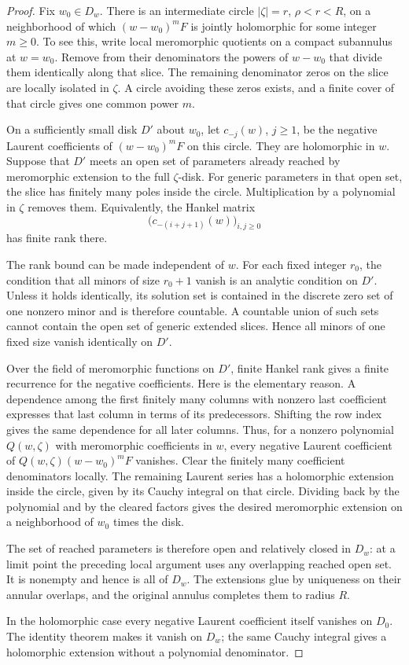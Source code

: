 \begin{proof}
Fix \(w_0\in D_w\).  There is an intermediate circle
\(|\zeta|=r\), \(\rho<r<R\), on a neighborhood of which
\((w-w_0)^m F\) is jointly holomorphic for some integer \(m\ge0\).
To see this, write local meromorphic quotients on a compact
subannulus at \(w=w_0\).  Remove from their denominators the powers
of \(w-w_0\) that divide them identically along that slice.  The
remaining denominator zeros on the slice are locally isolated in
\(\zeta\).  A circle avoiding these zeros exists, and a finite cover
of that circle gives one common power \(m\).

On a sufficiently small disk \(D'\) about \(w_0\), let
\(c_{-j}(w)\), \(j\ge1\), be the negative Laurent coefficients of
\((w-w_0)^mF\) on this circle.  They are holomorphic in \(w\).
Suppose that \(D'\) meets an open set of parameters already reached
by meromorphic extension to the full \(\zeta\)-disk.  For generic
parameters in that open set, the slice has finitely many poles
inside the circle.  Multiplication by a polynomial in \(\zeta\)
removes them.  Equivalently, the Hankel matrix
\[
 \big(c_{-(i+j+1)}(w)\big)_{i,j\ge0}
\]
has finite rank there.

The rank bound can be made independent of \(w\).  For each fixed
integer \(r_0\), the condition that all minors of size \(r_0+1\)
vanish is an analytic condition on \(D'\).  Unless it holds
identically, its solution set is contained in the discrete zero
set of one nonzero minor and is therefore countable.  A countable
union of such sets cannot contain the open set of generic
extended slices.  Hence all minors of one fixed size vanish
identically on \(D'\).

Over the field of meromorphic functions on \(D'\), finite Hankel
rank gives a finite recurrence for the negative coefficients.  Here
is the elementary reason.  A dependence among the first finitely
many columns with nonzero last coefficient expresses that last
column in terms of its predecessors.  Shifting the row index
gives the same dependence for all later columns.  Thus, for a
nonzero polynomial \(Q(w,\zeta)\) with meromorphic coefficients
in \(w\), every negative Laurent coefficient of
\(Q(w,\zeta)(w-w_0)^mF\) vanishes.  Clear the finitely many
coefficient denominators locally.  The remaining Laurent series
has a holomorphic extension inside the circle, given by its
Cauchy integral on that circle.  Dividing back by the polynomial
and by the cleared factors gives the desired meromorphic
extension on a neighborhood of \(w_0\) times the disk.

The set of reached parameters is therefore open and relatively
closed in \(D_w\): at a limit point the preceding local argument
uses any overlapping reached open set.  It is nonempty and hence
is all of \(D_w\).  The extensions glue by uniqueness on their
annular overlaps, and the original annulus completes them to
radius \(R\).

In the holomorphic case every negative Laurent coefficient itself
vanishes on \(D_0\).  The identity theorem makes it vanish on
\(D_w\); the same Cauchy integral gives a holomorphic extension
without a polynomial denominator.
\end{proof}

